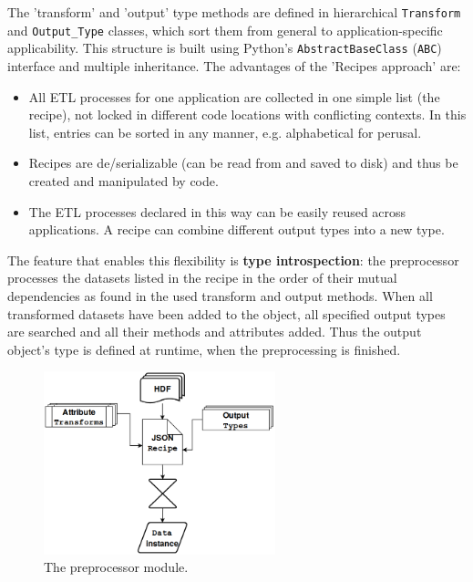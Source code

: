 The 'transform' and 'output' type methods are defined in hierarchical
\texttt{Transform} and \texttt{Output\_Type} classes, which sort them from
general to application-specific applicability. This structure is built using
Python's \texttt{AbstractBaseClass} (\texttt{ABC}) interface and multiple
inheritance. The advantages of the 'Recipes approach' are:
\begin{itemize}
\item All ETL processes for one application are collected in one simple list
    (the recipe), not locked in different code locations with conflicting
    contexts. In this list, entries can be sorted in any manner, e.g.
    alphabetical for perusal.
\item Recipes are de/serializable (can be read from and saved to disk) and thus be
    created and manipulated by code.
\item The ETL processes declared in this way can be easily reused across
    applications. A recipe can combine different output types into a new type.
\end{itemize}

The feature that enables this flexibility is \textbf{type introspection}: the
preprocessor processes the datasets listed in the recipe in the order of their
mutual dependencies as found in the used transform and output methods. When all
transformed datasets have been added to the object, all specified output types
are searched and all their methods and attributes added. Thus the output
object's type is defined at runtime, when the preprocessing is finished.

\begin{figure}[htb!]
    \centering
    \includegraphics[width=0.6\textwidth]{img/reader_flowchart4.png}
    \caption{The preprocessor module.}
    \label{fig:preprocessor}
\end{figure}




